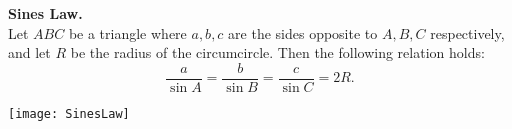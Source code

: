 \documentclass[12pt]{article}
\begin{document}
\textbf{Sines Law.}\\
Let $ABC$ be a triangle where $a,b,c$ are the sides opposite to $A,B,C$ respectively, and let $R$ be the radius of the circumcircle. Then the following relation holds:
$$\frac{a}{\sin A}=\frac{b}{\sin B}=\frac{c}{\sin C}=2R.$$
\medskip
\begin{center}
\texttt{[image: SinesLaw]}
\end{center}
\end{document}
